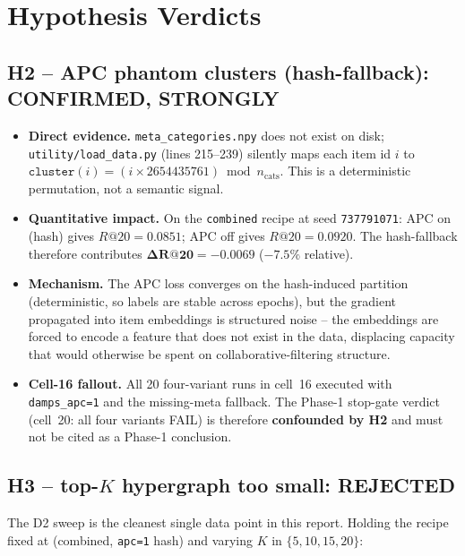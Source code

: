 \documentclass[11pt,a4paper]{article}
\begin{document}
\section{Hypothesis Verdicts}

\subsection{H2 -- APC phantom clusters (hash-fallback): \textbf{CONFIRMED, STRONGLY}}

\begin{itemize}[leftmargin=*]
\item \textbf{Direct evidence.} \texttt{meta\_categories.npy} does not exist
      on disk; \texttt{utility/load\_data.py} (lines 215--239) silently
      maps each item id $i$ to
      $\texttt{cluster}(i) = (i \times 2654435761) \bmod n_{\text{cats}}$.
      This is a deterministic permutation, not a semantic signal.
\item \textbf{Quantitative impact.} On the \texttt{combined} recipe at seed
      \texttt{737791071}: APC on (hash) gives \(R@20=0.0851\); APC off
      gives \(R@20=0.0920\). The hash-fallback therefore contributes
      \(\boldsymbol{\Delta R@20 = -0.0069}\) (\(-7.5\%\) relative).
\item \textbf{Mechanism.} The APC loss converges on the hash-induced
      partition (deterministic, so labels are stable across epochs), but
      the gradient propagated into item embeddings is structured noise
      -- the embeddings are forced to encode a feature that does not
      exist in the data, displacing capacity that would otherwise be spent
      on collaborative-filtering structure.
\item \textbf{Cell-16 fallout.} All 20 four-variant runs in cell~16
      executed with \texttt{damps\_apc=1} and the missing-meta fallback.
      The Phase-1 stop-gate verdict (cell~20: all four variants FAIL) is
      therefore \textbf{confounded by H2} and must not be cited as a
      Phase-1 conclusion.
\end{itemize}

\subsection{H3 -- top-\(K\) hypergraph too small: \textbf{REJECTED}}

The D2 sweep is the cleanest single data point in this report. Holding the
recipe fixed at (combined, \texttt{apc=1} hash) and varying \(K\) in
$\{5, 10, 15, 20\}$:
\end{document}
